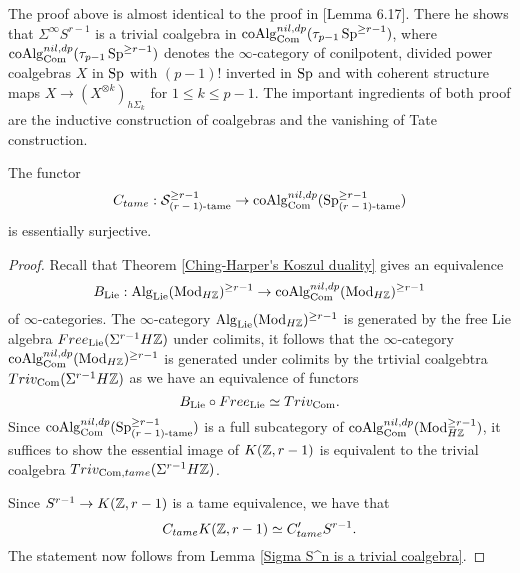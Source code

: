 \begin{remark}
	The proof above is almost identical to the proof in \cite{Heuts_Goodwillie}[Lemma 6.17]. 
	There he shows that $\Sigma^{\infty}S^{r-1}$ is a trivial coalgebra in $\operatorname{coAlg}^{nil, dp}_{\operatorname{Com}}(\tau_{p-1}\operatorname{Sp}^{\geq r-1})$,
	where $\operatorname{coAlg}^{nil, dp}_{\operatorname{Com}}(\tau_{p-1}\operatorname{Sp}^{\geq r-1})$ denotes the $\infty$-category of conilpotent, divided power coalgebras $X$ in $\operatorname{Sp}$ with $(p-1)!$ inverted in $\operatorname{Sp}$ and with coherent structure maps $X\to (X^{\otimes k})_{h\Sigma_k}$ for $1\leq k \leq p-1$. 
	The important ingredients of both proof are the inductive construction of coalgebras and the vanishing of Tate construction.
\end{remark}

\begin{lemma}
\label{Essential Surjectivity of C_tame}
	The functor 
	$$
	C_{tame}: {\mathcal{S}}^{\geq r-1}_{\text{($r-1$)-tame}}  
	\to 
	\operatorname{coAlg}^{nil, dp}_{\operatorname{Com}}(\operatorname{Sp}^{\geq r-1}_{\text{($r-1$)-tame}})
	$$
	is essentially surjective.
\end{lemma}
\begin{proof}
Recall that Theorem \ref{Ching-Harper's Koszul duality}
gives an equivalence
$$
B_{\operatorname{Lie}}: \operatorname{Alg}_{\operatorname{Lie}}(\operatorname{Mod}_{H{\mathbb{Z}}})^{\geq r-1} \to \operatorname{coAlg}^{nil, dp}_{\operatorname{Com}}(\operatorname{Mod}_{H{\mathbb{Z}}})^{\geq r-1}
$$
of $\infty$-categories. The $\infty$-category $\operatorname{Alg}_{\operatorname{Lie}}(\operatorname{Mod}_{H{\mathbb{Z}}})^{\geq r-1}$ is generated by the free Lie algebra $Free_{\operatorname{Lie}}(\Sigma^{r-1} H{\mathbb{Z}})$ under colimits,
 it follows that the $\infty$-category $\operatorname{coAlg}^{nil, dp}_{\operatorname{Com}}(\operatorname{Mod}_{H{\mathbb{Z}}})^{\geq r-1}$ is generated under colimits by the trtivial coalgebtra $Triv_{\operatorname{Com}}(\Sigma^{r-1}H {\mathbb{Z}})$ as we have an equivalence of functors
$$
B_{\operatorname{Lie}}\circ Free_{\operatorname{Lie}} \simeq Triv_{\operatorname{Com}}.
$$
Since $\operatorname{coAlg}^{nil, dp}_{\operatorname{Com}}(\operatorname{Sp}^{\geq r-1}_{\text{($r-1$)-tame}})$ is a full subcategory of $\operatorname{coAlg}^{nil, dp}_{\operatorname{Com}}(\operatorname{Mod}_{H{\mathbb{Z}}}^{\geq r-1})$,
it suffices to show the essential image of $K({\mathbb{Z}}, r-1)$ is equivalent to the trivial coalgebra $Triv_{\operatorname{Com},tame}(\Sigma^{r-1}H {\mathbb{Z}})$.

Since $S^{r-1}\to K({\mathbb{Z}},r-1)$ is a tame equivalence, we have that
$$
C_{tame}K({\mathbb{Z}},r-1) \simeq C'_{tame} S^{r-1}.
$$
The statement now follows from Lemma \ref{Sigma S^n is a trivial coalgebra}.
\end{proof}






